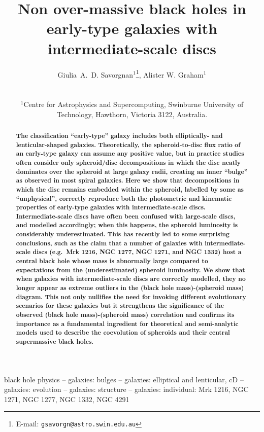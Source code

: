 \documentclass[useAMS,usenatbib,article]{mnras}
\title[Non over-massive black holes in early-type galaxies]{Non over-massive black holes in early-type galaxies with intermediate-scale discs}
\author[G.~A.~D. Savorgnan \& A.~W. Graham]
{\parbox{\textwidth}{
Giulia~A.~D. Savorgnan$^{1}$\thanks{E-mail: \texttt{gsavorgn@astro.swin.edu.au}},
Alister W. Graham$^{1}$}\vspace{0.4cm}\\
\parbox{\textwidth}{
$^{1}$Centre for Astrophysics and Supercomputing, Swinburne University of Technology, Hawthorn, Victoria 3122, Australia.\\}}
\begin{document}
\maketitle

\label{firstpage}



\begin{abstract}
{\bf The classification ``early-type'' galaxy includes both elliptically- and lenticular-shaped galaxies. 
Theoretically, the spheroid-to-disc flux ratio of an early-type galaxy can assume any positive value,  
but in practice studies often consider only spheroid/disc decompositions 
in which the disc neatly dominates over the spheroid at large galaxy radii, 
creating an inner ``bulge'' as observed in most spiral galaxies. 
Here we show that decompositions in which the disc remains embedded within the spheroid, 
labelled by some as ``unphysical'',  
correctly reproduce both the photometric and kinematic properties of early-type galaxies 
with intermediate-scale discs. 
Intermediate-scale discs have often been confused with large-scale discs, and modelled accordingly; 
when this happens, the spheroid luminosity is considerably underestimated. 
This has recently led to some surprising conclusions, 
such as the claim that a number of galaxies with intermediate-scale discs (e.g.~Mrk 1216, NGC 1277, NGC 1271, and NGC 1332) 
host a central black hole whose mass is abnormally large compared to expectations from the (underestimated) spheroid luminosity. 
We show that when galaxies with intermediate-scale discs are correctly modelled, 
they no longer appear as extreme outliers in the (black hole mass)-(spheroid mass) diagram. 
This not only nullifies the need for invoking different evolutionary scenarios for these galaxies 
but it strengthens the significance of the observed (black hole mass)-(spheroid mass) correlation 
and confirms its importance as a fundamental ingredient for theoretical and semi-analytic models 
used to describe the coevolution of spheroids and their central supermassive black holes. }

\end{abstract}

\begin{keywords}
black hole physics -- galaxies: bulges -- galaxies: elliptical and lenticular, cD -- 
galaxies: evolution -- galaxies: structure -- galaxies: individual: Mrk 1216, NGC 1271, NGC 1277, NGC 1332, NGC 4291
\end{keywords}
\end{document}
